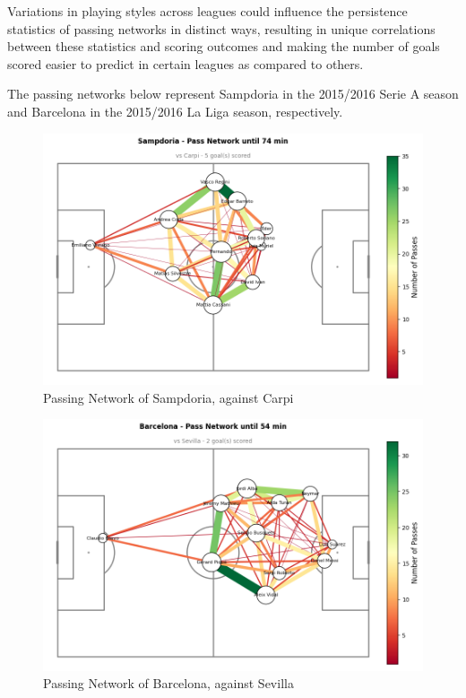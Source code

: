 \documentclass[10pt,twocolumn]{article}
\begin{document}
Variations in playing styles across leagues could influence the persistence statistics of passing networks in distinct ways, resulting in unique correlations between these statistics and scoring outcomes and making the number of goals scored easier to predict in certain leagues as compared to others. 

The passing networks below represent Sampdoria in the 2015/2016 Serie A season and Barcelona in the 2015/2016 La Liga season, respectively.

\begin{figure}[H]
    \centering
    \includegraphics[width=1\linewidth]{images/SerieA.png}
    \caption{Passing Network of Sampdoria, against Carpi}
    \label{fig:SerieA_passing_network}
\end{figure}
\begin{figure}[H]
    \centering
    \includegraphics[width=1\linewidth]{images/LaLiga.png}
    \caption{Passing Network of Barcelona, against Sevilla}
    \label{fig:LaLiga_passing_network}
\end{figure}
\end{document}
